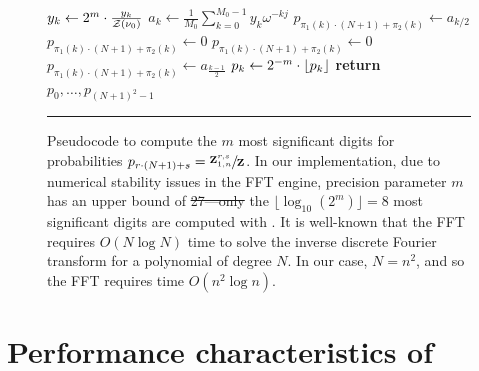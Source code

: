 \documentclass[11pt, oneside]{Thesis} %
\providecommand{\DIFadd}[1]{{\protect\color{blue}\uwave{#1}}} %
\providecommand{\DIFdel}[1]{{\protect\color{red}\sout{#1}}}                      %
\providecommand{\DIFaddFL}[1]{\DIFadd{#1}} %
\providecommand{\DIFdelFL}[1]{\DIFdel{#1}} %
\providecommand{\DIFaddbeginFL}{} %
\providecommand{\DIFaddendFL}{} %
\providecommand{\DIFdelbeginFL}{} %
\providecommand{\DIFdelendFL}{} %
\begin{document}
\begin{figure}[!ht]
\begin{algorithmic}[1]
\State $y_k \gets 2^m \cdot \frac{y_k}{{\mathcal Z}_{}(\nu_0)}$
\EndFor
{}
\State $a_k \gets \frac{1}{M_0} \sum_{k=0}^{M_0-1} y_k \omega^{-kj}$
\EndFor
{}
\State $p_{\pi_1(k) \cdot (N+1) + \pi_2(k)} \gets a_{k/2}$
\Else
\State $p_{\pi_1(k) \cdot (N+1) + \pi_2(k)} \gets 0$
\EndIf
\Else
{}
\State $p_{\pi_1(k) \cdot (N+1) + \pi_2(k)} \gets 0$
\Else
\State $p_{\pi_1(k) \cdot (N+1) + \pi_2(k)} \gets a_{\frac{k-1}{2}}$
\EndIf
\EndIf
\EndFor
{}
\State $p_k \gets 2^{-m} \cdot \lfloor p_k \rfloor$
\EndFor
\State \textbf{return} $p_0,\dots,p_{(N + 1)^2 - 1}$
\EndFunction
\rule[-0.35ex]{0pt}{0pt}
\end{algorithmic}
\caption[Pseudocode for improved \ffttwo]{
Pseudocode to compute the $m$ most significant digits
for probabilities
\DIFdelbeginFL \DIFdelFL{$p_{r\cdot(N + 1)+s} = \sfrac{{\bf Z}^{r,s}_{1,n}}{{\bf Z}^{}_{}}$}\DIFdelendFL \DIFaddbeginFL \DIFaddFL{$p_{r\cdot(N + 1)+s} = \frac{\bfZ{r,s}{1,n}}{\fullZ}$}\DIFaddendFL . In our implementation,
due to numerical stability issues in the FFT engine, precision parameter
$m$ has an upper bound of \DIFdelbeginFL \DIFdelFL{27---only }\DIFdelendFL \DIFaddbeginFL \DIFaddFL{$27$---only }\DIFaddendFL the $\lfloor \log_{10}(2^m) \rfloor =8$ most significant digits
are computed with \ffttwo. It is well-known that
the FFT requires $O(N \log N)$ time to solve the inverse discrete
Fourier transform for a polynomial of degree $N$. In our case,
$N=n^2$, and so the FFT requires time $O(n^2 \log n)$.
}
\label{fig:ffttwo:algoImproved}
\rule[0ex]{0pt}{1.5em} \hrule
\end{figure}

\section{Performance characteristics of \ffttwo}
\label{sec:ffttwo:speed}
\end{document}
